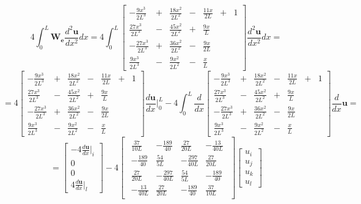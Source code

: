 $$4 \int_0^L \mathbf{W_e} \frac{d^2 \mathbf{u}}{dx^2} dx
=
4\int_0^L
\begin{bmatrix}
	-\frac{9x^3}{2L^3}&+&\frac{18x^2}{2L^2}&-&\frac{11x}{2L} &+& 1\\
	\frac{27x^3}{2L^3}&-&\frac{45x^2}{2L^2}&+&\frac{9x}{L}&&\\
	-\frac{27x^3}{2L^3}&+&\frac{36x^2}{2L^2}&-&\frac{9x}{2L}&&\\
	\frac{9x^3}{2L^3}&-&\frac{9x^2}{2L^2}&-&\frac{x}{L}&&
\end{bmatrix}
\frac{d^2 \mathbf{u}}{dx^2} dx
=
$$
$$
=
4
\begin{bmatrix}
	-\frac{9x^3}{2L^3}&+&\frac{18x^2}{2L^2}&-&\frac{11x}{2L} &+& 1\\
	\frac{27x^3}{2L^3}&-&\frac{45x^2}{2L^2}&+&\frac{9x}{L}&&\\
	-\frac{27x^3}{2L^3}&+&\frac{36x^2}{2L^2}&-&\frac{9x}{2L}&&\\
	\frac{9x^3}{2L^3}&-&\frac{9x^2}{2L^2}&-&\frac{x}{L}&&
\end{bmatrix}
\frac{d\mathbf{u}}{dx} |_0^L
  -4  \int_0^L \frac{d}{dx}
\begin{bmatrix}
	-\frac{9x^3}{2L^3}&+&\frac{18x^2}{2L^2}&-&\frac{11x}{2L} &+& 1\\
	\frac{27x^3}{2L^3}&-&\frac{45x^2}{2L^2}&+&\frac{9x}{L}&&\\
	-\frac{27x^3}{2L^3}&+&\frac{36x^2}{2L^2}&-&\frac{9x}{2L}&&\\
	\frac{9x^3}{2L^3}&-&\frac{9x^2}{2L^2}&-&\frac{x}{L}&&
\end{bmatrix}
\frac{d}{dx} \mathbf{u}
=$$
$$
=
\begin{bmatrix}
	  -4 \frac{d\mathbf{u}}{dx}|_i \\
	0\\
	0\\
4\frac{d\mathbf{u}}{dx}|_l
\end{bmatrix}
  -4 
\begin{bmatrix}
\begin{array}{rrrr}
	\frac{37}{10L} & -\frac{189}{40} & \frac{27}{20L} & -\frac{13}{40L}\\
	-\frac{189}{40} & \frac{54}{5L} & -\frac{297}{40L} & \frac{27}{20L}\\
	\frac{27}{20L} &  -\frac{297}{40L} & \frac{54}{5L} & -\frac{189}{40}\\
	-\frac{13}{40L} & \frac{27}{20L} & -\frac{189}{40} & \frac{37}{10L}
\end{array}
\end{bmatrix}
\begin{bmatrix}
u_i \\
u_j \\
u_k\\
u_l
\end{bmatrix}
$$




